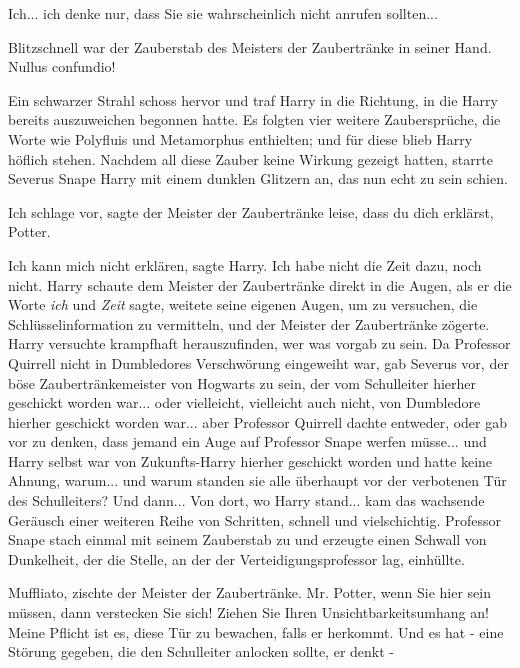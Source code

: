 \glqq{}Ich... ich denke nur, dass Sie sie wahrscheinlich nicht anrufen
sollten...\grqq{}

Blitzschnell war der Zauberstab des Meisters der Zaubertränke in seiner Hand.
\glqq{}Nullus confundio!\grqq{}

Ein schwarzer Strahl schoss hervor und traf Harry in die Richtung, in die Harry
bereits auszuweichen begonnen hatte. Es folgten vier weitere Zaubersprüche, die
Worte wie Polyfluis und Metamorphus enthielten; und für diese blieb Harry
höflich stehen. Nachdem all diese Zauber keine Wirkung gezeigt hatten, starrte
Severus Snape Harry mit einem dunklen Glitzern an, das nun echt zu sein schien.

\glqq{}Ich schlage vor\grqq{}, sagte der Meister der Zaubertränke leise, \glqq{}
dass du dich erklärst, Potter.\grqq{}

\glqq{}Ich kann mich nicht erklären\grqq{}, sagte Harry. \glqq{}Ich habe nicht die
Zeit dazu, noch nicht.\grqq{} Harry schaute dem Meister der Zaubertränke direkt
in die Augen, als er die Worte \glqq{}\emph{ich}\grqq{} und \glqq{}
\emph{Zeit}\grqq{} sagte, weitete seine eigenen Augen, um zu versuchen, die
Schlüsselinformation zu vermitteln, und der Meister der Zaubertränke zögerte.
Harry versuchte krampfhaft herauszufinden, wer was vorgab zu sein. Da Professor
Quirrell nicht in Dumbledores Verschwörung eingeweiht war, gab Severus vor, der
böse Zaubertränkemeister von Hogwarts zu sein, der vom Schulleiter hierher
geschickt worden war... oder vielleicht, vielleicht auch nicht, von Dumbledore
hierher geschickt worden war... aber Professor Quirrell dachte entweder, oder
gab vor zu denken, dass jemand ein Auge auf Professor Snape werfen müsse... und
Harry selbst war von Zukunfts-Harry hierher geschickt worden und hatte keine
Ahnung, warum... und warum standen sie alle überhaupt vor der verbotenen Tür des
Schulleiters? Und dann... Von dort, wo Harry stand... kam das wachsende Geräusch
einer weiteren Reihe von Schritten, schnell und vielschichtig. Professor Snape
stach einmal mit seinem Zauberstab zu und erzeugte einen Schwall von Dunkelheit,
der die Stelle, an der der Verteidigungsprofessor lag, einhüllte.

\glqq{}Muffliato\grqq{}, zischte der Meister der Zaubertränke. \glqq{}Mr. Potter,
wenn Sie hier sein müssen, dann verstecken Sie sich! Ziehen Sie Ihren
Unsichtbarkeitsumhang an! Meine Pflicht ist es, diese Tür zu bewachen, falls er
herkommt. Und es hat - eine Störung gegeben, die den Schulleiter anlocken
sollte, er denkt -\grqq{}

